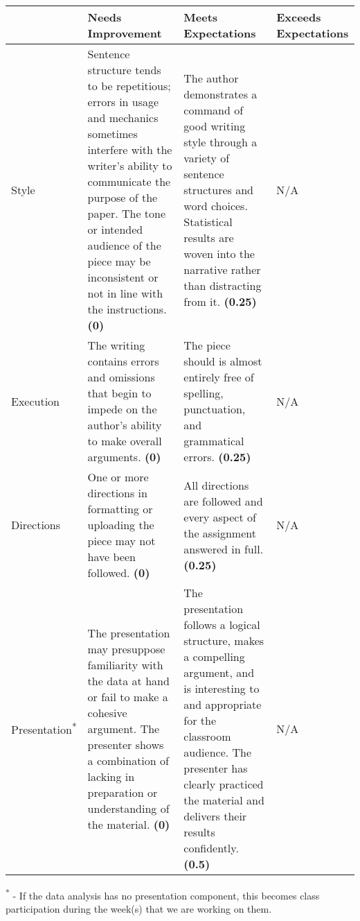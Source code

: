 \documentclass{article}
\begin{document}
\renewcommand{\arraystretch}{1.8}
\begin{tabular}{p{4cm}||p{6cm}|p{6cm}|p{6cm}}
& Needs Improvement & Meets Expectations & Exceeds Expectations \\
\hline \hline
Style
  & Sentence structure tends to be repetitious; errors in usage and
  mechanics sometimes interfere with the writer's ability to communicate the
  purpose of the paper. The tone or intended audience of the piece may be
  inconsistent or not in line with the instructions. \textbf{(0)}
  & The author demonstrates a command of good writing style through a
  variety of sentence structures and word choices. Statistical results are
  woven into the narrative rather than distracting from it. \textbf{(0.25)}
  & N/A \\ \hline
Execution
  &  The writing contains errors and omissions that begin to impede on the
  author's ability to make overall arguments. \textbf{(0)}
  & The piece should is almost entirely free of spelling, punctuation, and
  grammatical errors. \textbf{(0.25)}
  & N/A \\ \hline
Directions
  & One or more directions in formatting or uploading the piece may not have been followed. \textbf{(0)}
  & All directions are followed and every aspect of the assignment answered in full. \textbf{(0.25)}
  & N/A \\ \hline
Presentation\textsuperscript{*}
  & The presentation may presuppose familiarity with the data at hand or fail
  to make a cohesive argument. The presenter shows a combination of lacking in
  preparation or understanding of the material. \textbf{(0)}
  & The presentation follows a logical structure, makes a compelling argument,
  and is interesting to and appropriate for the classroom audience. The presenter
  has clearly practiced the material and delivers their results confidently. \textbf{(0.5)}
  & N/A \\
\end{tabular}

\vspace*{68pt}

\textsuperscript{*} - If the data analysis has no presentation component, this
becomes class participation during the week(s) that we are working on them.
\end{document}
